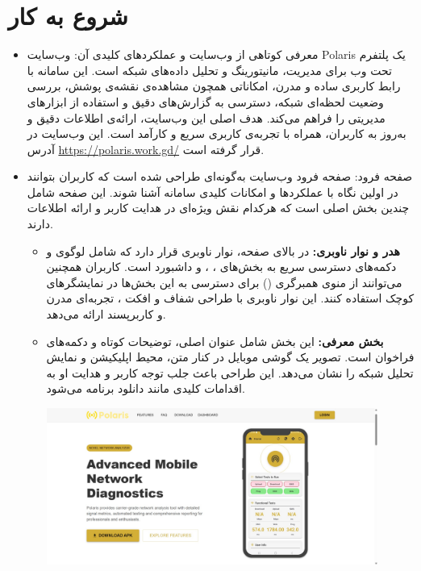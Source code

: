     \section{شروع به کار}
    \begin{itemize}
    	\item  معرفی کوتاهی از وب‌سایت و عملکردهای کلیدی آن: وب‌سایت Polaris یک پلتفرم تحت وب برای مدیریت، مانیتورینگ و تحلیل داده‌های شبکه است. این سامانه با رابط کاربری ساده و مدرن، امکاناتی همچون مشاهده‌ی نقشه‌ی پوشش، بررسی وضعیت لحظه‌ای شبکه، دسترسی به گزارش‌های دقیق و استفاده از ابزارهای مدیریتی را فراهم می‌کند. هدف اصلی این وب‌سایت، ارائه‌ی اطلاعات دقیق و به‌روز به کاربران، همراه با تجربه‌ی کاربری سریع و کارآمد است. این وب‌سایت در آدرس \url{https://polaris.work.gd/} قرار گرفته است.
    	\item  صفحه فرود: صفحه فرود وب‌سایت  به‌گونه‌ای طراحی شده است که کاربران بتوانند در اولین نگاه با عملکردها و امکانات کلیدی سامانه آشنا شوند. این صفحه شامل چندین بخش اصلی است که هرکدام نقش ویژه‌ای در هدایت کاربر و ارائه اطلاعات دارند.

        \begin{itemize}
            \item \textbf{هدر و نوار ناوبری:}  
            در بالای صفحه، نوار ناوبری قرار دارد که شامل لوگوی  و دکمه‌های دسترسی سریع به بخش‌های ، ،  و داشبورد است. کاربران همچنین می‌توانند از منوی همبرگری () برای دسترسی به این بخش‌ها در نمایشگرهای کوچک استفاده کنند. این نوار ناوبری با طراحی شفاف و افکت ، تجربه‌ای مدرن و کاربرپسند ارائه می‌دهد.
        
            \item \textbf{بخش معرفی:}  
            این بخش شامل عنوان اصلی، توضیحات کوتاه و دکمه‌های فراخوان است. تصویر یک گوشی موبایل در کنار متن، محیط اپلیکیشن و نمایش تحلیل شبکه را نشان می‌دهد. این طراحی باعث جلب توجه کاربر و هدایت او به اقدامات کلیدی مانند دانلود برنامه می‌شود.  
            \begin{center}
                \includegraphics[width=0.9\textwidth]{images/fr_hero.jpg}
            \end{center}
        

\end{itemize}
\end{itemize}
